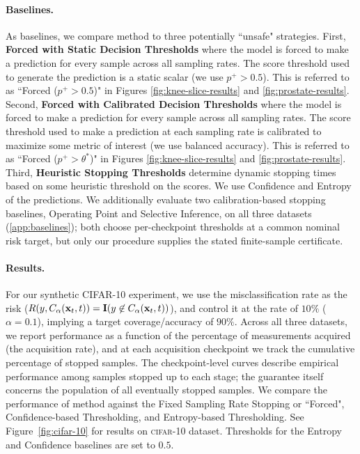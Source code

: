 \paragraph{Baselines.} As baselines, we compare \gls{method} to three potentially ``unsafe" strategies. 
First, \textbf{Forced with Static Decision Thresholds} where the model is forced to make a prediction for every sample across all sampling rates. 
The score threshold used to generate the prediction is a static scalar (we use $p^+ > 0.5$).
This is referred to as ``Forced ($p^+ > 0.5$)" in  Figures \ref{fig:knee-slice-results} and \ref{fig:prostate-results}.
Second, \textbf{Forced with Calibrated Decision Thresholds} where the model is forced to make a prediction for every sample across all sampling rates. 
The score threshold used to make a prediction at each sampling rate is calibrated to maximize some metric of interest (we use balanced accuracy). 
This is referred to as ``Forced ($p^+ > \theta^*$)" in Figures \ref{fig:knee-slice-results} and \ref{fig:prostate-results}.
Third, \textbf{Heuristic Stopping Thresholds} determine dynamic stopping times based on some heuristic threshold on the scores. 
We use Confidence and Entropy of the predictions. We additionally evaluate two calibration-based stopping baselines, Operating Point and Selective Inference, on all three datasets (\cref{app:baselines}); both choose per-checkpoint thresholds at a common nominal risk target, but only our procedure supplies the stated finite-sample certificate.


\paragraph{Results.} 
For our synthetic CIFAR-10 experiment, we use the misclassification rate as the risk ($R(y, C_{\alpha}(\mathbf{x}_t, t)) = \mathbf{I}(y \not\in C_\alpha(\mathbf{x}_t, t))$), and control it at the rate of $10\%$ ($\alpha=0.1$), implying a target coverage/accuracy of $90\%$. 
Across all three datasets, we report performance as a function of the percentage of measurements acquired (the acquisition rate), and at each acquisition checkpoint we track the cumulative percentage of stopped samples. 
The checkpoint-level curves describe empirical performance among samples stopped up to each stage; the guarantee itself concerns the population of all eventually stopped samples. We compare the performance of \gls{method} against the Fixed Sampling Rate Stopping or ``Forced", Confidence-based Thresholding, and Entropy-based Thresholding. See Figure~\ref{fig:cifar-10} for results on \textsc{cifar-10} dataset. Thresholds for the Entropy and Confidence baselines are set to $0.5$.

